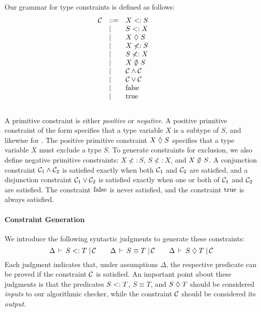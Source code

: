 Our grammar for type constraints is defined as follows:\\[-.2em]
\[
\begin{array}{llll}
\C &::=& X <: S~~~~ &\\
&\mid& S <: X &\\
&\mid& X \exc S &\\
&\mid& X \not<: S~~~~ &\\
&\mid& S \not<: X &\\
&\mid& X \nexc S &\\
&\mid& \C \wedge \C\\%
&\mid& \C \vee \C\\%
&\mid& \FALSE\\%
&\mid& \TRUE\\%
\end{array}
\]
\\
A primitive constraint is either {\it positive} or {\it negative}.
A positive primitive constraint of the form  specifies that
a type variable $X$ is a subtype of $S$, and likewise for .
The positive primitive constraint $X \mathrel{\lozenge} S$ specifies that a type variable $X$ must exclude a type $S$.
To generate constraints for exclusion, we also define negative primitive constraints:
$X \not<: S$, $S \not<: X$, and $X \nexc S$.
A conjunction constraint $\mathcal{C}_1 \wedge \mathcal{C}_2$ is satisfied exactly
when both $\mathcal{C}_1$ and $\mathcal{C}_2$ are satisfied,
and a disjunction constraint $\mathcal{C}_1 \vee \mathcal{C}_2$ is satisfied exactly
when one or both of $\mathcal{C}_1$ and $\mathcal{C}_2$ are satisfied.
The constraint $\textrm{false}$ is never satisfied, and the constraint $\textrm{true}$ is always satisfied.

\paragraph{Constraint Generation}
We introduce the following syntactic judgments to generate these constraints:
\[ {\Delta}\,\vdash\,{S}\;{<:}\;{T}\;|\,{\mathcal{C}} \quad\quad {\Delta}\,\vdash\,{S}\;{\equiv}\;{T}\;|\,{\mathcal{C}} \quad\quad {\Delta}\,\vdash\,{S}\;{\mathrel{\lozenge}}\;{T}\;|\,{\mathcal{C}} \]%
Each judgment indicates that, under assumptions $\Delta$,
the respective predicate can be proved if the constraint $\mathcal{C}$ is
satisfied. An important point about these judgments is that the
predicates $S <: T$, $S \equiv T$, and $S \mathrel{\lozenge} T$ should
be considered \emph{inputs} to our algorithmic checker, while the
constraint $\mathcal{C}$ should be considered its \emph{output}.

